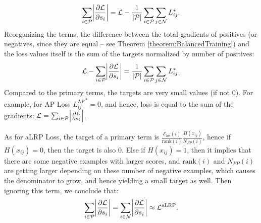 \documentclass{article}
\begin{document}
\begin{align}
  \sum_{i \in \mathcal{P}} \abs{\frac{\partial \mathcal{L}}{\partial s_i}} = \mathcal{L} - \frac{1}{|\mathcal{P}|} \sum \limits_{i \in \mathcal{P}} \sum \limits_{j \in \mathcal{N}} L_{ij}^* .
\end{align}
Reorganizing the terms, the difference between the total gradients of positives (or negatives, since they are equal -- see Theorem \ref{theorem:BalancedTraining}) and the loss values itself is the sum of the targets normalized by number of positives:
\begin{align}
  \mathcal{L}- \sum_{i \in \mathcal{P}} \abs{\frac{\partial \mathcal{L}}{\partial s_i}} = \frac{1}{|\mathcal{P}|} \sum \limits_{i \in \mathcal{P}} \sum \limits_{j \in \mathcal{N}} L_{ij}^* .
\end{align}
Compared to the primary terms, the targets are very small values (if not $0$). For example, for AP Loss ${L_{ij}^\mathrm{AP}}^*=0$, and hence, loss is  equal to the sum of the gradients: $\mathcal{L} = \sum_{i \in \mathcal{P}} \abs{\frac{\partial \mathcal{L}}{\partial s_i}}$.

As for aLRP Loss, the target of a primary term is $\frac{ \mathcal{E}_{loc}(i)}{\mathrm{rank}(i)} \frac{H(x_{ij})}{N_{FP}(i)}$, hence if $H(x_{ij})=0$, then the target is also $0$. Else if $H(x_{ij})=1$, then it implies that there are some negative examples with larger scores, and $\mathrm{rank}(i)$ and $N_{FP}(i)$ are getting larger depending on these number of negative examples, which causes the denominator to grow, and hence  yielding a small target as well. Then ignoring this term, we conclude that:
\begin{align}
     \sum_{i \in \mathcal{P}} \abs{\frac{\partial \mathcal{L}}{\partial s_i}} =  \sum_{i \in \mathcal{N}} \abs{\frac{\partial \mathcal{L}}{\partial s_i}} \approx \mathcal{L}^{\mathrm{aLRP}} .
\end{align}
\end{document}
